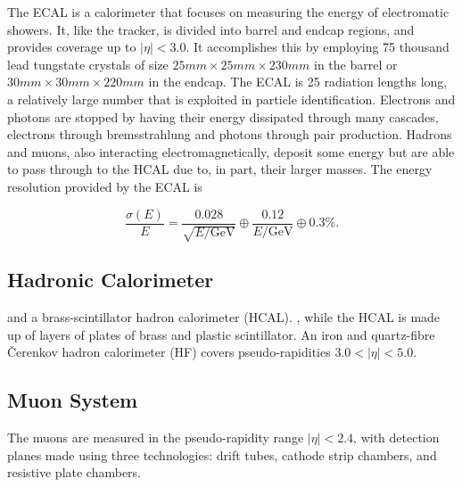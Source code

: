 The ECAL is a calorimeter that focuses on measuring the energy of electromatic showers.
It, like the tracker, is divided into barrel and endcap regions, and provides coverage up to
$|\eta| < 3.0$.
It accomplishes this by employing 75 thousand lead tungstate crystals of size
$25 mm \times 25 mm \times 230 mm$ in the barrel or $30 mm \times 30 mm \times 220 mm$ in the endcap.
The ECAL is 25 radiation lengths long, a relatively large number that is exploited in
particle identification. Electrons and photons are stopped by having their energy dissipated
through many cascades, electrons through bremsstrahlung and photons through pair production.
Hadrons and muons, also interacting electromagnetically, deposit some energy
but are able to pass through to the HCAL due to, in part, their larger masses. The energy resolution
provided by the ECAL is

\begin{equation}
\frac{\sigma(E)}{E} = \frac{0.028}{\sqrt{E/\textrm{GeV}}} \oplus \frac{0.12}{E/\textrm{GeV}} \oplus 0.3\% .
\end{equation}

\subsection{Hadronic Calorimeter\label{subsec:hcal}}


and a brass-scintillator hadron calorimeter (HCAL).
, while the HCAL is made up of layers of
plates of brass and plastic scintillator.
An iron and quartz-fibre \v{C}erenkov hadron calorimeter (HF) covers pseudo-rapidities
$3.0 < |\eta|< 5.0$.

\subsection{Muon System\label{subsec:muonsystem}}
The muons are measured in the pseudo-rapidity range $|\eta|< 2.4$,
with detection planes made using three technologies: drift tubes, cathode strip chambers, and
resistive plate chambers.



